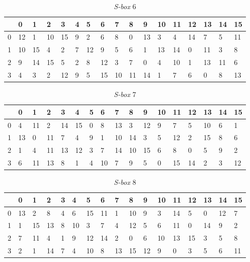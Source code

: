 \begin{enumerate}
\begin{table}
	\begin{center}
		\begin{tabular}{|l|l|l|l|l|l|l|l|l|l|l|l|l|l|l|l|l|}
				\hline
				& 0 & 1	& 2 & 3 & 4 & 5 & 6 & 7 & 8 & 9 & 10 & 11 & 12 & 13 & 14 & 15	\\ \hline
			0	&	12	&	1	&	10	&	15	&	9	&	2	&	6	&	8	&	0	&	13	&	3	&	4	&	14	&	7	&	5	&	11	\\ \hline
			1	&	10	&	15	&	4	&	2	&	7	&	12	&	9	&	5	&	6	&	1	&	13	&	14	&	0	&	11	&	3	&	8	\\ \hline
			2	&	9	&	14	&	15	&	5	&	2	&	8	&	12	&	3	&	7	&	0	&	4	&	10	&	1	&	13	&	11	&	6	\\ \hline
			3	&	4	&	3	&	2	&	12	&	9	&	5	&	15	&	10	&	11	&	14	&	1	&	7	&	6	&	0	&	8	&	13	\\ \hline
		\end{tabular}
	\end{center}
	\label{table:s_box6}
	\caption{\textit{S-box} 6}
\end{table}

\begin{table}
	\begin{center}
		\begin{tabular}{|l|l|l|l|l|l|l|l|l|l|l|l|l|l|l|l|l|}
				\hline
					& 0 & 1	& 2 & 3 & 4 & 5 & 6 & 7 & 8 & 9 & 10 & 11 & 12 & 13 & 14 & 15	\\ \hline
				0	&	4	&	11	&	2	&	14	&	15	&	0	&	8	&	13	&	3	&	12	&	9	&	7	&	5	&	10	&	6	&	1	\\ \hline
				1	&	13	&	0	&	11	&	7	&	4	&	9	&	1	&	10	&	14	&	3	&	5	&	12	&	2	&	15	&	8	&	6	\\ \hline
				2	&	1	&	4	&	11	&	13	&	12	&	3	&	7	&	14	&	10	&	15	&	6	&	8	&	0	&	5	&	9	&	2	\\ \hline
				3	&	6	&	11	&	13	&	8	&	1	&	4	&	10	&	7	&	9	&	5	&	0	&	15	&	14	&	2	&	3	&	12	\\ \hline
		\end{tabular}
	\end{center}
	\label{table:s_box7}
	\caption{\textit{S-box} 7}
\end{table}

\begin{table}
	\begin{center}
		\begin{tabular}{|l|l|l|l|l|l|l|l|l|l|l|l|l|l|l|l|l|}
				\hline
				& 0 & 1	& 2 & 3 & 4 & 5 & 6 & 7 & 8 & 9 & 10 & 11 & 12 & 13 & 14 & 15	\\ \hline
			0	&	13	&	2	&	8	&	4	&	6	&	15	&	11	&	1	&	10	&	9	&	3	&	14	&	5	&	0	&	12	&	7	\\ \hline
			1	&	1	&	15	&	13	&	8	&	10	&	3	&	7	&	4	&	12	&	5	&	6	&	11	&	0	&	14	&	9	&	2	\\ \hline
			2	&	7	&	11	&	4	&	1	&	9	&	12	&	14	&	2	&	0	&	6	&	10	&	13	&	15	&	3	&	5	&	8	\\ \hline
			3	&	2	&	1	&	14	&	7	&	4	&	10	&	8	&	13	&	15	&	12	&	9	&	0	&	3	&	5	&	6	&	11	\\ \hline
		\end{tabular}
	\end{center}
	\label{table:s_box8}
	\caption{\textit{S-box} 8}
\end{table}


\end{enumerate}
